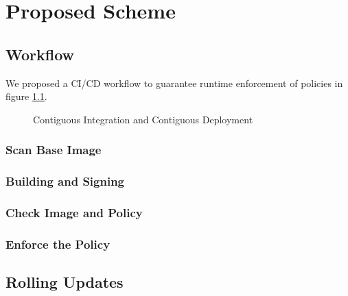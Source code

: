 \chapter{Proposed Scheme}

\section{Workflow}
We proposed a CI/CD workflow to guarantee runtime enforcement of policies 
in figure \ref{fig:workflow}.

\begin{figure}
    \centering
    \label{fig:workflow}
    \caption{Contiguous Integration and Contiguous Deployment}
\end{figure}

\subsection{Scan Base Image}
\subsection{Building and Signing}
\subsection{Check Image and Policy}
\subsection{Enforce the Policy}

\section{Rolling Updates}